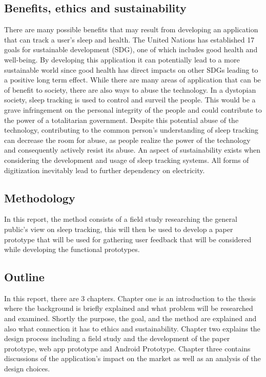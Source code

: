 \documentclass{article}
\begin{document}
\subsection{Benefits, ethics and sustainability}
There are many possible benefits that may result from developing an application that can track a user's sleep and health. The United Nations has established 17 goals for sustainable development (SDG), one of which includes good health and well-being. By developing this application it can potentially lead to a more sustainable world since good health has direct impacts on other SDGs leading to a positive long term effect. While there are many areas of application that can be of benefit to society, there are also ways to abuse the technology. In a dystopian society, sleep tracking is used to control and surveil the people. This would be a grave infringement on the personal integrity of the people and could contribute to the power of a totalitarian government. Despite this potential abuse of the technology, contributing to the common person’s understanding of sleep tracking can decrease the room for abuse, as people realize the power of the technology and consequently actively resist its abuse. An aspect of sustainability exists when considering the development and usage of sleep tracking systems. All forms of digitization inevitably lead to further dependency on electricity.\cite{noauthor_17_nodate}

\subsection{Methodology}
In this report, the method consists of a field study researching the general public’s view on sleep tracking, this will then be used to develop a paper prototype that will be used for gathering user feedback that will be considered while developing the functional prototypes. 

\subsection{Outline}
In this report, there are 3 chapters.
Chapter one is an introduction to the thesis where the background is briefly explained and what problem will be researched and examined. Shortly the purpose, the goal, and the method are explained and also what connection it has to ethics and sustainability. Chapter two explains the design process including a field study and the development of the paper prototype, web app prototype and Android Prototype. Chapter three contains discussions of the application’s impact on the market as well as an analysis of the design choices. 
\end{document}
